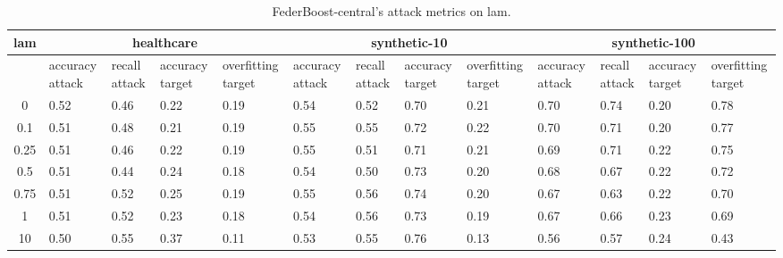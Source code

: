 \begin{table*}[]\centering
\begin{tabular}{|c| *{12}{m{1.0cm}|}}
\hline\rowcolor{gray!50}
\cellcolor{gray!80} lam & \multicolumn{4}{c|}{healthcare} & \multicolumn{4}{c|}{synthetic-10} & \multicolumn{4}{c|}{synthetic-100}\\\hline 
& accuracy attack & recall attack & accuracy target & overfitting target & accuracy attack & recall attack & accuracy target & overfitting target & accuracy attack & recall attack & accuracy target & overfitting target\\\hline
0 & 0.52 & 0.46 & 0.22 & 0.19 & 0.54 & 0.52 & 0.70 & 0.21 & 0.70 & 0.74 & 0.20 & 0.78\\ \hline
0.1 & 0.51 & 0.48 & 0.21 & 0.19 & 0.55 & 0.55 & 0.72 & 0.22 & 0.70 & 0.71 & 0.20 & 0.77\\ \hline
0.25 & 0.51 & 0.46 & 0.22 & 0.19 & 0.55 & 0.51 & 0.71 & 0.21 & 0.69 & 0.71 & 0.22 & 0.75\\ \hline
0.5 & 0.51 & 0.44 & 0.24 & 0.18 & 0.54 & 0.50 & 0.73 & 0.20 & 0.68 & 0.67 & 0.22 & 0.72\\ \hline
0.75 & 0.51 & 0.52 & 0.25 & 0.19 & 0.55 & 0.56 & 0.74 & 0.20 & 0.67 & 0.63 & 0.22 & 0.70\\ \hline
1 & 0.51 & 0.52 & 0.23 & 0.18 & 0.54 & 0.56 & 0.73 & 0.19 & 0.67 & 0.66 & 0.23 & 0.69\\ \hline
10 & 0.50 & 0.55 & 0.37 & 0.11 & 0.53 & 0.55 & 0.76 & 0.13 & 0.56 & 0.57 & 0.24 & 0.43\\ \hline
\end{tabular} 
\caption{FederBoost-central's attack metrics on lam.}
\label{tab:experiment1_lam}
\end{table*}
